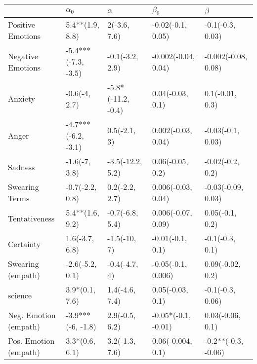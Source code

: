 \begin{tabular}{lllll}
\toprule
{} &           $\alpha_0$ &            $\alpha$ &            $\beta_0$ &              $\beta$ \\
\midrule
Positive Emotions     &      5.4**(1.9, 8.8) &        2(-3.6, 7.6) &    -0.02(-0.1, 0.05) &     -0.1(-0.3, 0.03) \\
Negative Emotions     &  -5.4***(-7.3, -3.5) &     -0.1(-3.2, 2.9) &  -0.002(-0.04, 0.04) &  -0.002(-0.08, 0.08) \\
Anxiety               &        -0.6(-4, 2.7) &  -5.8*(-11.2, -0.4) &     0.04(-0.03, 0.1) &      0.1(-0.01, 0.3) \\
Anger                 &  -4.7***(-6.2, -3.1) &        0.5(-2.1, 3) &   0.002(-0.03, 0.04) &    -0.03(-0.1, 0.03) \\
Sadness               &        -1.6(-7, 3.8) &    -3.5(-12.2, 5.2) &     0.06(-0.05, 0.2) &     -0.02(-0.2, 0.2) \\
Swearing Terms        &      -0.7(-2.2, 0.8) &      0.2(-2.2, 2.7) &   0.006(-0.03, 0.04) &   -0.03(-0.09, 0.03) \\
Tentativeness         &      5.4**(1.6, 9.2) &     -0.7(-6.8, 5.4) &   0.006(-0.07, 0.09) &      0.05(-0.1, 0.2) \\
Certainty             &       1.6(-3.7, 6.8) &        -1.5(-10, 7) &     -0.01(-0.1, 0.1) &      -0.1(-0.3, 0.1) \\
Swearing (empath)     &      -2.6(-5.2, 0.1) &       -0.4(-4.7, 4) &   -0.05(-0.1, 0.006) &     0.09(-0.02, 0.2) \\
science               &       3.9*(0.1, 7.6) &      1.4(-4.6, 7.4) &     0.05(-0.03, 0.1) &     -0.1(-0.3, 0.06) \\
Neg. Emotion (empath) &    -3.9***(-6, -1.8) &      2.9(-0.5, 6.2) &  -0.05*(-0.1, -0.01) &     0.03(-0.06, 0.1) \\
Pos. Emotion (empath) &       3.3*(0.6, 6.1) &      3.2(-1.3, 7.6) &    0.06(-0.004, 0.1) &  -0.2**(-0.3, -0.06) \\
\bottomrule
\end{tabular}
